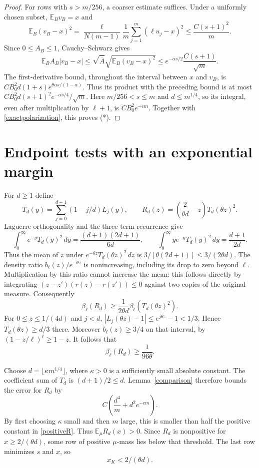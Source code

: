 \documentclass[11pt]{article}
\newcommand{\E}{\mathbb E}
\begin{document}
\begin{proof}
For rows with $s>m/256$, a coarser estimate suffices. Under a uniformly
chosen subset, $\E_Bv_B=x$ and
\[
 \E_B(v_B-x)^2
 =\frac{\ell}{N(m-1)}\frac1m\sum_{j=1}^m(\ell u_j-x)^2
 \le\frac{C(s+1)^2}{m}.
\]
Since $0\le A_B\le1$, Cauchy--Schwarz gives
\[
 \E_B A_B|v_B-x|
 \le\sqrt{\overline A}\sqrt{\E_B(v_B-x)^2}
 \le e^{-\alpha s/2}\frac{C(s+1)}{\sqrt m}.
\]
The first-derivative bound, throughout the interval between $x$ and
$v_B$, is $CB_0^2d(1+s)e^{\theta\alpha s/(1-\alpha)}$.
Thus its product with the preceding bound is at most
$CB_0^2d(s+1)^2e^{-\alpha s/4}/\sqrt m$.
Here $m/256<s\le m$ and $d\le m^{1/4}$, so its integral, even after
multiplication by $\ell+1$, is $CB_0^2e^{-cm}$.
Together with \eqref{exactpolarization}, this proves (*).
\end{proof}

\section*{Endpoint tests with an exponential margin}
For $d\ge1$ define
\[
 T_d(y)=\sum_{j=0}^{d-1}(1-j/d)L_j(y),\qquad
 R_d(z)=\left(\frac{2}{\theta d}-z\right)T_d(\theta z)^2.
\]
Laguerre orthogonality and the three-term recurrence give
\[
 \int_0^\infty e^{-y}T_d(y)^2\,dy
   =\frac{(d+1)(2d+1)}{6d},\qquad
 \int_0^\infty ye^{-y}T_d(y)^2\,dy
   =\frac{d+1}{2d}.
\]
Thus the mean of $z$ under $e^{-\theta z}T_d(\theta z)^2\,dz$
is $3/[\theta(2d+1)]\le3/(2\theta d)$.
The density ratio $b_\ell(z)/e^{-\theta z}$ is nonincreasing,
including its drop to zero beyond $\ell$. Multiplication by this
ratio cannot increase the mean: this follows directly by integrating
$(z-z')(r(z)-r(z'))\le0$ against two copies of the original measure.
Consequently
\[
 \beta_\ell(R_d)
 \ge\frac1{2\theta d}\beta_\ell(T_d(\theta z)^2).
\]
For $0\le z\le1/(4d)$ and $j<d$,
$|L_j(\theta z)-1|\le e^{j\theta z}-1<1/3$.
Hence $T_d(\theta z)\ge d/3$ there. Moreover $b_\ell(z)\ge3/4$
on that interval, by $(1-z/\ell)^\ell\ge1-z$.
It follows that
\begin{equation}\label{positiveR}
 \beta_\ell(R_d)\ge\frac1{96\theta}.
\end{equation}

Choose $d=\lfloor\kappa m^{1/4}\rfloor$, where $\kappa>0$ is a
sufficiently small absolute constant. The coefficient sum of $T_d$
is $(d+1)/2\le d$. Lemma~\ref{comparison} therefore bounds the error
for $R_d$ by
\[
 C\left(\frac{d^4}{m}+d^2e^{-cm}\right).
\]
By first choosing $\kappa$ small and then $m$ large, this is smaller
than half the positive constant in \eqref{positiveR}.
Thus $\E_\mu R_d(x)>0$. Since $R_d$ is nonpositive for
$x\ge2/(\theta d)$, some row of positive $\mu$-mass lies below
that threshold. The last row minimizes $s$ and $x$, so
\begin{equation}\label{lastx}
 x_K<2/(\theta d).
\end{equation}
\end{document}
